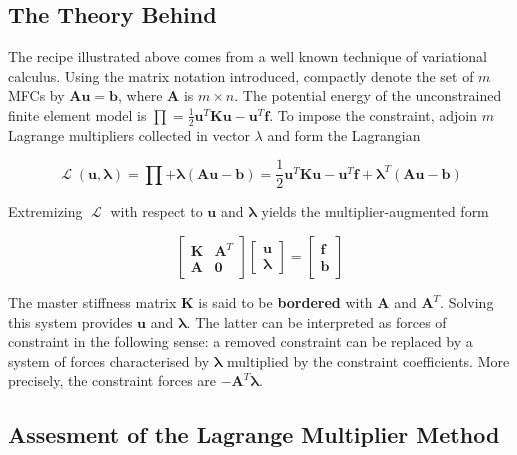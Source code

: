 \documentclass[10pt,b5paper,titlepage]{book}
\newcommand{\lagr}{\mathop{\mathcal{L}}}
\newcommand{\m}{\mathbf}
\newcommand{\M}{\pmb}
\begin{document}
\subsection{The Theory Behind}

The recipe illustrated above comes from a well known technique of variational
calculus. Using the matrix notation introduced, compactly denote the set of
$ m $ MFCs by $ \m{A} \m{u} = \m{b} $, where $ \m{A} $ is
$ m \times n $. The potential energy of the unconstrained finite element model is
$ \prod = \frac{1}{2} \m{u}^T \m{K} \m{u} - \m{u}^T \m{f} $.
To impose the constraint, adjoin $ m $ Lagrange multipliers collected in vector
$ \lambda $ and form the Lagrangian

\begin{equation}
    \lagr(\m{u}, \M{\lambda}) = \prod + \M{\lambda}
    \left( \m{A} \m{u} - \m{b}\right)
    = \frac{1}{2} \m{u}^T \m{K} \m{u} - \m{u}^T \m{f} + \M{\lambda}^T
    \left( \m{A} \m{u} - \m{b}\right)
\end{equation}

Extremizing $ \lagr $ with respect to $ \m{u} $ and $ \M{\lambda} $ yields
the multiplier-augmented form

\begin{equation}\label{mfc-multiplier-augmented-form}
    \begin{bmatrix}
        \m{K} & \m{A}^T \\
        \m{A} & \m{0}
    \end{bmatrix}
    \begin{bmatrix}
        \m{u} \\
        \M{\lambda}
    \end{bmatrix}
    = \begin{bmatrix}
        \m{f} \\
        \m{b}
    \end{bmatrix}
\end{equation}

The master stiffness matrix $ \m{K} $ is said to be \textbf{bordered} with
$ \m{A} $ and $ \m{A}^T $. Solving this system provides $ \m{u} $ and $ \M{\lambda} $.
The latter can be interpreted as forces of constraint in the following sense:
a removed constraint can be replaced by a system of forces characterised by
$ \M{\lambda} $ multiplied by the constraint coefficients. More precisely,
the constraint forces are $ -\m{A}^T \M{\lambda} $.


\subsection{Assesment of the Lagrange Multiplier Method}
\end{document}
